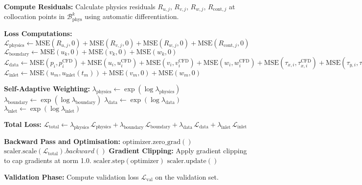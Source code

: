 \documentclass[12pt, a4paper]{article}
\begin{document}
\begin{algorithm}[H]
\begin{algorithmic}[1]
        \State \textbf{Compute Residuals:}
        \State Calculate physics residuals $R_{u,j}$, $R_{v,j}$, $R_{w,j}$, $R_{\mathrm{cont},j}$ at collocation points in $\mathcal{B}_{\text{phys}}^k$ using automatic differentiation.
        
        \State \textbf{Loss Computations:}
        \State $\mathcal{L}_{\mathrm{physics}} \leftarrow \text{MSE}(R_{u,j}, 0) + \text{MSE}(R_{v,j}, 0) + \text{MSE}(R_{w,j}, 0) + \text{MSE}(R_{\mathrm{cont},j}, 0)$
        \State $\mathcal{L}_{\mathrm{boundary}} \leftarrow \text{MSE}(u_k, 0) + \text{MSE}(v_k, 0) + \text{MSE}(w_k, 0)$
        \State $\mathcal{L}_{\mathrm{data}} \leftarrow \text{MSE}(p_i, p_i^{\mathrm{CFD}}) + \text{MSE}(u_i, u_i^{\mathrm{CFD}}) + \text{MSE}(v_i, v_i^{\mathrm{CFD}}) + \text{MSE}(w_i, w_i^{\mathrm{CFD}}) + \text{MSE}(\tau_{x,i}, \tau_{x,i}^{\mathrm{CFD}}) + \text{MSE}(\tau_{y,i}, \tau_{y,i}^{\mathrm{CFD}}) + \text{MSE}(\tau_{z,i}, \tau_{z,i}^{\mathrm{CFD}})$
        \State $\mathcal{L}_{\mathrm{inlet}} \leftarrow \text{MSE}(u_m, u_{\mathrm{inlet}}(t_m)) + \text{MSE}(v_m, 0) + \text{MSE}(w_m, 0)$
        
        \State \textbf{Self-Adaptive Weighting:}
        \State $\lambda_{\mathrm{physics}} \leftarrow \exp(\log \lambda_{\mathrm{physics}})$
        \State $\lambda_{\mathrm{boundary}} \leftarrow \exp(\log \lambda_{\mathrm{boundary}})$
        \State $\lambda_{\mathrm{data}} \leftarrow \exp(\log \lambda_{\mathrm{data}})$
        \State $\lambda_{\mathrm{inlet}} \leftarrow \exp(\log \lambda_{\mathrm{inlet}})$
        
        \State \textbf{Total Loss:}
        \State $\mathcal{L}_{\mathrm{total}} \leftarrow \lambda_{\mathrm{physics}}\,\mathcal{L}_{\mathrm{physics}} + \lambda_{\mathrm{boundary}}\,\mathcal{L}_{\mathrm{boundary}} + \lambda_{\mathrm{data}}\,\mathcal{L}_{\mathrm{data}} + \lambda_{\mathrm{inlet}}\,\mathcal{L}_{\mathrm{inlet}}$
        
        \State \textbf{Backward Pass and Optimisation:}
        \State $\mathrm{optimizer.zero\_grad()}$
        \State $\mathrm{scaler.scale}(\mathcal{L}_{\mathrm{total}}).backward()$
        \State \textbf{Gradient Clipping:} Apply gradient clipping to cap gradients at norm 1.0.
        \State $\mathrm{scaler.step}(\mathrm{optimizer})$
        \State $\mathrm{scaler.update()}$
        
    \EndFor
    
    \State \textbf{Validation Phase:}
    \State Compute validation loss $\mathcal{L}_{\mathrm{val}}$ on the validation set.
    

\end{algorithmic}
\end{algorithm}
\end{document}
